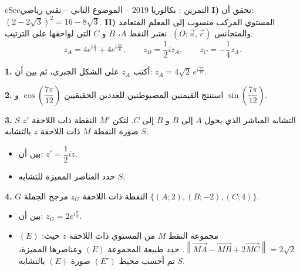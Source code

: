 \documentclass[12pt,a4paper]{article}
\newenvironment{BOX}[2]{\begin{otherlanguage}{english}\begin{arbox}{#1}{#2}}{\end{arbox}\end{otherlanguage}}
\newcounter{exo}
\newenvironment{tamrin}[1]{\stepcounter{exo}\begin{BOX}{cSec}{التمرين \theexo: #1}}{\end{BOX}}
\newenvironment{sq}{\begin{itemize}[leftmargin=2.4em,itemsep=3pt]}{\end{itemize}}
\newcommand{\qa}{\item[(أ)]}\newcommand{\qb}{\item[(ب)]}\newcommand{\qc}{\item[(جـ)]}\newcommand{\qd}{\item[(د)]}\newcommand{\qe}{\item[(هـ)]}
\newcommand{\QQ}[1]{\par\smallskip\textbf{#1.} }
\begin{document}
\begin{tamrin}{بكالوريا 2019 -- الموضوع الثاني -- تقني رياضي}
\textbf{I)} تحقق أن: $(2-2\sqrt3)^2=16-8\sqrt3$.
\textbf{II)} المستوي المركب منسوب إلى المعلم المتعامد والمتجانس $(O;\vec u,\vec v)$. نعتبر النقط $A$، $B$ و $C$ التي لواحقها على الترتيب:
\[z_A=4e^{i\frac{\pi}{3}}+4e^{i\frac{5\pi}{6}},\qquad z_B=\frac12iz_A,\qquad z_C=-\frac14z_A.\]
\QQ{1} أكتب $z_A$ على الشكل الجبري، ثم بين أن: $z_A=4\sqrt2\,e^{i\frac{7\pi}{12}}$.

\QQ{2} استنتج القيمتين المضبوطتين للعددين الحقيقيين $\cos\left(\dfrac{7\pi}{12}\right)$ و $\sin\left(\dfrac{7\pi}{12}\right)$.

\QQ{3} $S$ التشابه المباشر الذي يحول $A$ إلى $B$ و $B$ إلى $C$. لتكن $M'$ النقطة ذات اللاحقة $z'$ صورة النقطة $M$ ذات اللاحقة $z$ بالتشابه $S$.
\begin{sq}
\qa بين أن: $z'=\dfrac12iz$.
\qb حدد العناصر المميزة للتشابه $S$.
\end{sq}
\QQ{4} $G$ النقطة ذات اللاحقة $z_G$ مرجح الجملة $\{(A;2),(B;-2),(C;4)\}$.
\begin{sq}
\qa بين أن: $z_G=2e^{i\frac{\pi}{3}}$.
\qb $(E)$ مجموعة النقط $M$ من المستوي ذات اللاحقة $z$ حيث: $\left\|\overrightarrow{MA}-\overrightarrow{MB}+2\overrightarrow{MC}\right\|=2\sqrt2$.
حدد طبيعة المجموعة $(E)$ وعناصرها المميزة، ثم أحسب محيط $(E')$ صورة $(E)$ بالتشابه $S$.
\end{sq}
\end{tamrin}
\end{document}
